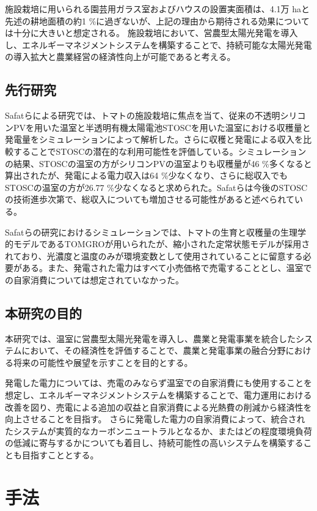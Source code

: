 \documentclass[uplatex,dvipdfmx,nomag,a4paper,oneside,onecolumn,12pt]{bxjsreport} %
\begin{document}
施設栽培に用いられる園芸用ガラス室およびハウスの設置実面積は、4.1万 haと先述の耕地面積の約1 \%に過ぎないが\cite{Engeishisetsu2022}、上記の理由から期待される効果については十分に大きいと想定される。
施設栽培において、営農型太陽光発電を導入し、エネルギーマネジメントシステムを構築することで、持続可能な太陽光発電の導入拡大と農業経営の経済性向上が可能であると考える。

\section{先行研究}
Safatらによる研究\cite{Safat2022}では、トマトの施設栽培に焦点を当て、従来の不透明シリコンPVを用いた温室と半透明有機太陽電池STOSCを用いた温室における収穫量と発電量をシミュレーションによって解析した。さらに収穫と発電による収入を比較することでSTOSCの潜在的な利用可能性を評価している。シミュレーションの結果、STOSCの温室の方がシリコンPVの温室よりも収穫量が46 \%多くなると算出されたが、発電による電力収入は64 \%少なくなり、さらに総収入でもSTOSCの温室の方が26.77 \%少なくなると求められた。Safatらは今後のSTOSCの技術進歩次第で、総収入についても増加させる可能性があると述べられている。


Safatらの研究におけるシミュレーションでは、トマトの生育と収穫量の生理学的モデルであるTOMGROが用いられたが、縮小された定常状態モデルが採用されており、光濃度と温度のみが環境変数として使用されていることに留意する必要がある。また、発電された電力はすべて小売価格で売電することとし、温室での自家消費については想定されていなかった。

\section{本研究の目的}
本研究では、温室に営農型太陽光発電を導入し、農業と発電事業を統合したシステムにおいて、その経済性を評価することで、農業と発電事業の融合分野における将来の可能性や展望を示すことを目的とする。

発電した電力については、売電のみならず温室での自家消費にも使用することを想定し、エネルギーマネジメントシステムを構築することで、電力運用における改善を図り、売電による追加の収益と自家消費による光熱費の削減から経済性を向上させることを目指す。
さらに発電した電力の自家消費によって、統合されたシステムが実質的なカーボンニュートラルとなるか、またはどの程度環境負荷の低減に寄与するかについても着目し、持続可能性の高いシステムを構築することも目指すこととする。


\chapter{手法}
\end{document}
